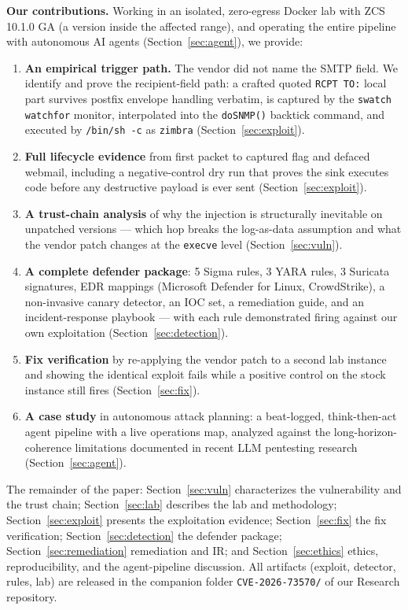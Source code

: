 \documentclass[journal]{IEEEtran}
\begin{document}
\textbf{Our contributions.} Working in an isolated, zero-egress Docker lab with
ZCS 10.1.0 GA (a version inside the affected range), and operating the entire
pipeline with autonomous AI agents (Section~\ref{sec:agent}), we provide:
\begin{enumerate}
\item \textbf{An empirical trigger path.} The vendor did not name the SMTP
      field. We identify and prove the recipient-field path: a crafted quoted
      \texttt{RCPT TO:} local part survives postfix envelope handling verbatim,
      is captured by the \texttt{swatch} \texttt{watchfor} monitor, interpolated
      into the \texttt{doSNMP()} backtick command, and executed by
      \texttt{/bin/sh -c} as \texttt{zimbra} (Section~\ref{sec:exploit}).
\item \textbf{Full lifecycle evidence} from first packet to captured flag and
      defaced webmail, including a negative-control dry run that proves the sink
      executes code before any destructive payload is ever sent
      (Section~\ref{sec:exploit}).
\item \textbf{A trust-chain analysis} of why the injection is structurally
      inevitable on unpatched versions — which hop breaks the
      log-as-data assumption and what the vendor patch changes at the
      \texttt{execve} level (Section~\ref{sec:vuln}).
\item \textbf{A complete defender package}: 5 Sigma rules, 3 YARA rules, 3
      Suricata signatures, EDR mappings (Microsoft Defender for Linux,
      CrowdStrike), a non-invasive canary detector, an IOC set, a remediation
      guide, and an incident-response playbook — with each rule demonstrated
      firing against our own exploitation (Section~\ref{sec:detection}).
\item \textbf{Fix verification} by re-applying the vendor patch to a second lab
      instance and showing the identical exploit fails while a positive control
      on the stock instance still fires (Section~\ref{sec:fix}).
\item \textbf{A case study} in autonomous attack planning: a beat-logged,
      think-then-act agent pipeline with a live operations map, analyzed against
      the long-horizon-coherence limitations documented in recent LLM
      pentesting research~\cite{wang2025checkmate} (Section~\ref{sec:agent}).
\end{enumerate}

The remainder of the paper: Section~\ref{sec:vuln} characterizes the
vulnerability and the trust chain; Section~\ref{sec:lab} describes the lab and
methodology; Section~\ref{sec:exploit} presents the exploitation evidence;
Section~\ref{sec:fix} the fix verification; Section~\ref{sec:detection} the
defender package; Section~\ref{sec:remediation} remediation and IR; and
Section~\ref{sec:ethics} ethics, reproducibility, and the agent-pipeline
discussion. All artifacts (exploit, detector, rules, lab) are released in the
companion folder \texttt{CVE-2026-73570/} of our Research repository.
\end{document}
